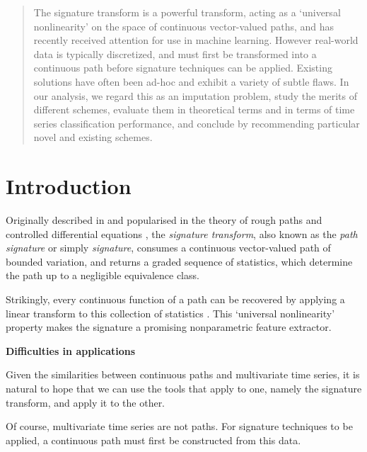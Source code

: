 \documentclass{article}
\renewcommand{\subsubsection}[1]{\textbf{#1}

} %
\begin{document}
\printAffiliationsAndNotice{\icmlEqualContribution} %

\begin{abstract}
The signature transform is a powerful transform, acting as a `universal nonlinearity' on the space of continuous vector-valued paths, and has recently received attention for use in machine learning. However real-world data is typically discretized, and must first be transformed into a continuous path before signature techniques can be applied. Existing solutions have often been ad-hoc and exhibit a variety of subtle flaws. In our analysis, we regard this as an imputation problem, study the merits of different schemes, evaluate them in theoretical terms and in terms of time series classification performance, and conclude by recommending particular novel and existing schemes.
\end{abstract}

\section{Introduction}\label{intro}
Originally described in \citep{Chen54, Chen57, Chen58} and popularised in the theory of rough paths and controlled differential equations \citep{lyons1998differential, hambly2010uniqueness, lyons2014rough}, the \emph{signature transform}, also known as the \emph{path signature} or simply \emph{signature}, consumes a continuous vector-valued path of bounded variation, and returns a graded sequence of statistics, which determine the path up to a negligible equivalence class.

Strikingly, every continuous function of a path can be recovered by applying a linear transform to this collection of statistics \citep[Proposition A.6]{kidger2019deep}. This `universal nonlinearity' property makes the signature a promising nonparametric feature extractor.

\subsubsection{Difficulties in applications}

Given the similarities between continuous paths and multivariate time series, it is natural to hope that we can use the tools that apply to one, namely the signature transform, and apply it to the other.

Of course, multivariate time series are not paths. For signature techniques to be applied, a continuous path must first be constructed from this data.
\end{document}
